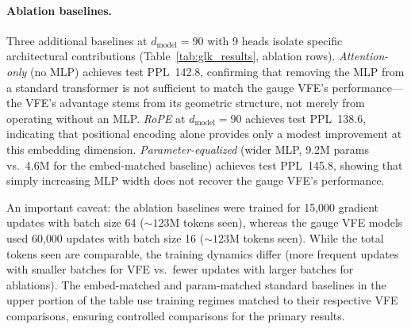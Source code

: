 \documentclass[twoside,11pt]{article}
\begin{document}
\paragraph{Ablation baselines.}
Three additional baselines at $d_{\text{model}} = 90$ with 9 heads isolate specific architectural contributions (Table~\ref{tab:glk_results}, ablation rows). \emph{Attention-only} (no MLP) achieves test PPL~142.8, confirming that removing the MLP from a standard transformer is not sufficient to match the gauge VFE's performance---the VFE's advantage stems from its geometric structure, not merely from operating without an MLP. \emph{RoPE} at $d_{\text{model}} = 90$ achieves test PPL~138.6, indicating that positional encoding alone provides only a modest improvement at this embedding dimension. \emph{Parameter-equalized} (wider MLP, 9.2M params vs.\ 4.6M for the embed-matched baseline) achieves test PPL~145.8, showing that simply increasing MLP width does not recover the gauge VFE's performance.

An important caveat: the ablation baselines were trained for 15{,}000 gradient updates with batch size 64 (${\sim}123$M tokens seen), whereas the gauge VFE models used 60{,}000 updates with batch size 16 (${\sim}123$M tokens seen). While the total tokens seen are comparable, the training dynamics differ (more frequent updates with smaller batches for VFE vs.\ fewer updates with larger batches for ablations). The embed-matched and param-matched standard baselines in the upper portion of the table use training regimes matched to their respective VFE comparisons, ensuring controlled comparisons for the primary results.
\end{document}

